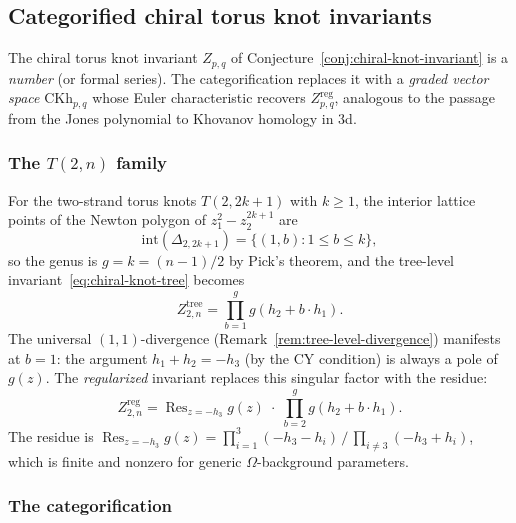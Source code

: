 \subsection{Categorified chiral torus knot invariants}
\label{subsec:categorified-chiral-torus-knots}

The chiral torus knot invariant $Z_{p,q}$ of Conjecture~\ref{conj:chiral-knot-invariant} is a \emph{number} (or formal series). The categorification replaces it with a \emph{graded vector space} $\mathrm{CKh}_{p,q}$ whose Euler characteristic recovers $Z_{p,q}^{\mathrm{reg}}$, analogous to the passage from the Jones polynomial to Khovanov homology in $3$d.

\subsubsection{The \texorpdfstring{$T(2,n)$}{T(2,n)} family}

For the two-strand torus knots $T(2, 2k+1)$ with $k \geq 1$, the interior lattice points of the Newton polygon of $z_1^2 - z_2^{2k+1}$ are
\[
 \mathrm{int}(\Delta_{2, 2k+1}) = \{(1, b) : 1 \leq b \leq k\},
\]
so the genus is $g = k = (n-1)/2$ by Pick's theorem, and the tree-level invariant~\eqref{eq:chiral-knot-tree} becomes
\begin{equation}\label{eq:t2n-tree}
 Z_{2,n}^{\mathrm{tree}} = \prod_{b=1}^{g} g(h_2 + b \cdot h_1).
\end{equation}
The universal $(1,1)$-divergence (Remark~\ref{rem:tree-level-divergence}) manifests at $b = 1$: the argument $h_1 + h_2 = -h_3$ (by the CY condition) is always a pole of $g(z)$. The \emph{regularized} invariant replaces this singular factor with the residue:
\begin{equation}\label{eq:t2n-regularized}
 Z_{2,n}^{\mathrm{reg}} = \operatorname{Res}_{z = -h_3} g(z) \;\cdot\; \prod_{b=2}^{g} g(h_2 + b \cdot h_1).
\end{equation}
The residue is $\operatorname{Res}_{z=-h_3} g(z) = \prod_{i=1}^{3}(-h_3 - h_i) \,\big/\, \prod_{i \neq 3}(-h_3 + h_i)$, which is finite and nonzero for generic $\Omega$-background parameters.

\subsubsection{The categorification}

